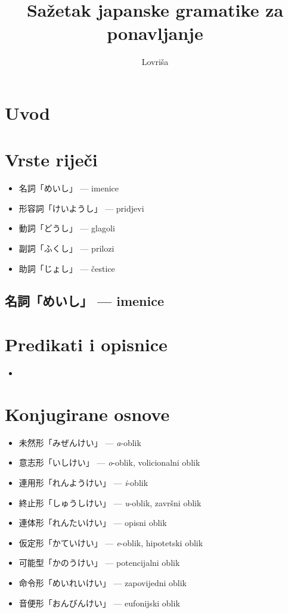 \documentclass[a4paper, 12pt]{amsart}
\title{Sažetak japanske gramatike za ponavljanje}
\author{Lovriša}
\begin{document}
	\maketitle
	
	\section{Uvod}
	
	\section{Vrste riječi}
	\begin{itemize}
		\item 名詞「めいし」 --- imenice
		\item 形容詞「けいようし」 --- pridjevi
		\item 動詞「どうし」 --- glagoli
		\item 副詞「ふくし」 --- prilozi
		\item 助詞「じょし」 --- čestice
	\end{itemize}
  \subsection{名詞「めいし」 --- imenice}

  \section{Predikati i opisnice}
  \begin{itemize}
  	\item 
  \end{itemize}

  \section{Konjugirane osnove}
  \begin{itemize}
  	\item 未然形「みぜんけい」 --- \textit{a}-oblik 
  	\item 意志形「いしけい」 --- \textit{o}-oblik, volicionalni oblik
  	\item 連用形「れんようけい」 --- \textit{i}-oblik
  	\item 終止形「しゅうしけい」 --- \textit{u}-oblik, završni oblik
  	\item 連体形「れんたいけい」 --- opisni oblik
  	\item 仮定形「かていけい」 --- \textit{e}-oblik, hipotetski oblik
  	\item 可能型「かのうけい」 --- potencijalni oblik
  	\item 命令形「めいれいけい」 --- zapovijedni oblik
  	\item 音便形「おんびんけい」 --- eufonijski oblik
  \end{itemize}
\end{document}

